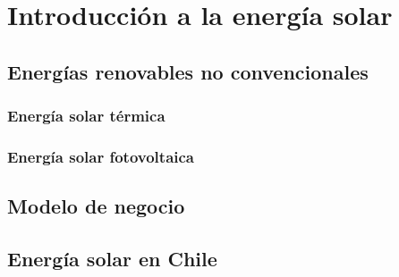 \chapter{Introducción a la energía solar}
\label{solar}

\section{Energías renovables no convencionales}
\subsection{Energía solar térmica}
\subsection{Energía solar fotovoltaica}
\section{Modelo de negocio}
\section{Energía solar en Chile}
